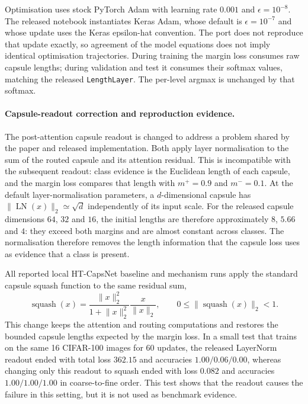 Optimisation uses stock PyTorch Adam with learning rate $0.001$ and
$\epsilon=10^{-8}$. The released notebook instantiates Keras Adam, whose
default is $\epsilon=10^{-7}$ and whose update uses the Keras epsilon-hat
convention. The port does not reproduce that update exactly, so agreement of
the model equations does not imply identical optimisation trajectories.
During training the margin loss consumes raw capsule lengths; during
validation and test it consumes their softmax values, matching the released
\texttt{LengthLayer}. The per-level argmax is unchanged by that softmax.

\paragraph{Capsule-readout correction and reproduction evidence.}
The post-attention capsule readout is changed to address a problem shared by the
paper and released implementation. Both apply layer normalisation to the sum of the
routed capsule and its attention residual. This is incompatible with the
subsequent readout: class evidence is the Euclidean length of each capsule, and
the margin loss compares that length with $m^+=0.9$ and $m^-=0.1$. At the
default layer-normalisation parameters, a $d$-dimensional capsule has
$\lVert\operatorname{LN}(x)\rVert_2\simeq\sqrt{d}$ independently of its input
scale. For the released capsule dimensions $64$, $32$ and $16$, the initial
lengths are therefore approximately $8$, $5.66$ and $4$: they exceed both
margins and are almost constant across classes. The normalisation therefore
removes the length information that the capsule loss uses as evidence that a
class is present.

All reported local HT-CapsNet baseline and mechanism runs apply the standard
capsule squash function to the same residual sum,
\[
\operatorname{squash}(x)
=\frac{\lVert x\rVert_2^2}{1+\lVert x\rVert_2^2}
  \frac{x}{\lVert x\rVert_2},
\qquad
0\leq\lVert\operatorname{squash}(x)\rVert_2<1.
\]
This change keeps the attention and routing computations and restores the
bounded capsule lengths expected by the margin loss. In a small test that trains
on the same 16 CIFAR-100 images for 60 updates, the
released LayerNorm readout ended with total loss $362.15$ and accuracies
$1.00/0.06/0.00$, whereas changing only this readout to squash ended with loss
$0.082$ and accuracies $1.00/1.00/1.00$ in coarse-to-fine order. This test shows
that the readout causes the failure in this setting, but it is not used as
benchmark evidence.

